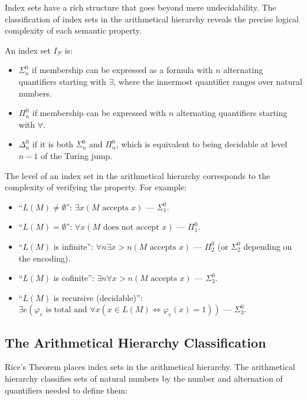 Index sets have a rich structure that goes beyond mere undecidability. The classification of index sets in the arithmetical hierarchy reveals the precise logical complexity of each semantic property.

\begin{definition}
An index set $I_\mathcal{P}$ is:
\begin{itemize}
\item $\Sigma^0_n$ if membership can be expressed as a formula with $n$ alternating quantifiers starting with $\exists$, where the innermost quantifier ranges over natural numbers.
\item $\Pi^0_n$ if membership can be expressed with $n$ alternating quantifiers starting with $\forall$.
\item $\Delta^0_n$ if it is both $\Sigma^0_n$ and $\Pi^0_n$, which is equivalent to being decidable at level $n-1$ of the Turing jump.
\end{itemize}
\end{definition}

The level of an index set in the arithmetical hierarchy corresponds to the complexity of verifying the property. For example:
\begin{itemize}
\item ``$L(M) \neq \emptyset$'': $\exists x (M \text{ accepts } x)$ --- $\Sigma^0_1$.
\item ``$L(M) = \emptyset$'': $\forall x (M \text{ does not accept } x)$ --- $\Pi^0_1$.
\item ``$L(M)$ is infinite'': $\forall n \exists x > n (M \text{ accepts } x)$ --- $\Pi^0_2$ (or $\Sigma^0_2$ depending on the encoding).
\item ``$L(M)$ is cofinite'': $\exists n \forall x > n (M \text{ accepts } x)$ --- $\Sigma^0_3$.
\item ``$L(M)$ is recursive (decidable)'': $\exists e (\varphi_e \text{ is total and } \forall x (x \in L(M) \iff \varphi_e(x) = 1))$ --- $\Sigma^0_3$.
\end{itemize}

\subsection{The Arithmetical Hierarchy Classification}
\label{sec:rice:hierarchy}

Rice's Theorem places index sets in the arithmetical hierarchy. The arithmetical hierarchy classifies sets of natural numbers by the number and alternation of quantifiers needed to define them:

